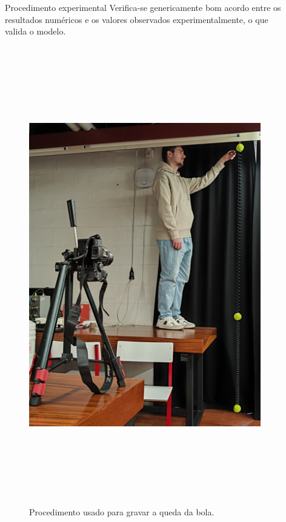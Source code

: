 \documentclass[final]{beamer}
\newlength{\sepwidth}
\newlength{\colwidth}
\newcommand{\separatorcolumn}{\begin{column}{\sepwidth}\end{column}}
\begin{document}
\begin{frame}[t]
\begin{columns}[t]
\begin{column}{\colwidth}
\begin{block}{Procedimento experimental}
Verifica-se genericamente bom acordo entre os resultados numéricos e os valores
observados experimentalmente, o que valida o modelo.
\vspace{2cm}
\begin{center}
\begin{figure}
\includegraphics[height=20cm]{images/Final.jpg}
\caption{Procedimento usado para gravar a queda da bola.}
\end{figure}
\end{center}
\end{block}
\end{column}

\separatorcolumn

\begin{column}{\colwidth}


\end{column}
\end{columns}
\end{frame}
\end{document}
